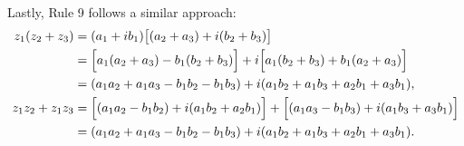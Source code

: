{{        Lastly, Rule 9 follows a similar approach:
        \begin{align*}
        z_1(z_2+z_3)
        &=(a_1+ib_1)\bigl[(a_2+a_3)+i(b_2+b_3)\bigr] \\
        &=\Bigl[a_1(a_2+a_3)-b_1(b_2+b_3)\Bigr]
        +i\Bigl[a_1(b_2+b_3)+b_1(a_2+a_3)\Bigr] \\
        &=(a_1a_2+a_1a_3-b_1b_2-b_1b_3)
        +i(a_1b_2+a_1b_3+a_2b_1+a_3b_1), \\
        z_1z_2+z_1z_3
        &=\Bigl[(a_1a_2-b_1b_2)+i(a_1b_2+a_2b_1)\Bigr]
        +\Bigl[(a_1a_3-b_1b_3)+i(a_1b_3+a_3b_1)\Bigr] \\
        &=(a_1a_2+a_1a_3-b_1b_2-b_1b_3)
        +i(a_1b_2+a_1b_3+a_2b_1+a_3b_1).
        \end{align*}
    }
}
\pagebreak
